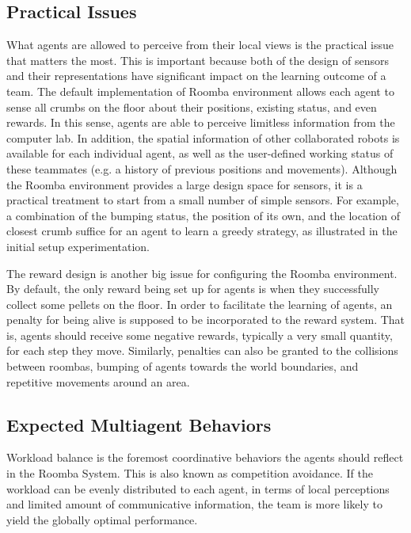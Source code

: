 \documentclass[conference]{IEEEtran}
\begin{document}
\subsection{Practical Issues}
What agents are allowed to perceive from their local views is the practical
issue that matters the most. 
This is important because both of the design of sensors and their
representations have significant impact on the learning outcome of a team. 
The default implementation of Roomba environment allows each agent to sense
all crumbs on the floor about their positions, existing status, and even rewards. 
In this sense, agents are able to perceive limitless information from the
computer lab. 
In addition, the spatial information of other collaborated robots
is available for each individual agent, as well as the user-defined working
status of these teammates (e.g. a history of previous positions and
movements).  Although the Roomba environment provides a large design space for
sensors, it is a practical treatment to start from a small number of simple
sensors. For example, a combination of the bumping status, the position of its
own, and the location of closest crumb suffice for an agent to learn a greedy
strategy, as illustrated in the initial setup experimentation.  

The reward design is another big issue for
configuring the Roomba environment. By default, the only reward being set up
for agents is when they successfully collect some pellets on the floor. In
order to facilitate the learning of agents, an penalty for being alive is
supposed to be incorporated to the reward system. That is, agents should
receive some negative rewards, typically a very small quantity, for each step
they move. Similarly, penalties can also be granted to the collisions between
roombas, bumping of agents towards the world boundaries, and repetitive
movements around an area.

\subsection{Expected Multiagent Behaviors}

Workload balance is the foremost coordinative behaviors the
agents should reflect in the Roomba System. This is also known as competition
avoidance. If the workload can be evenly distributed to each agent, in terms of
local perceptions and limited amount of communicative information, the team is
more likely to yield the globally optimal performance.
\end{document}
